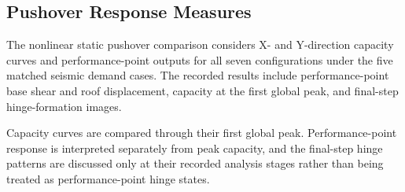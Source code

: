 \subsection{Pushover Response Measures}
The nonlinear static pushover comparison considers X- and Y-direction capacity curves and performance-point outputs for all seven configurations under the five matched seismic demand cases. The recorded results include performance-point base shear and roof displacement, capacity at the first global peak, and final-step hinge-formation images.

Capacity curves are compared through their first global peak. Performance-point response is interpreted separately from peak capacity, and the final-step hinge patterns are discussed only at their recorded analysis stages rather than being treated as performance-point hinge states.
